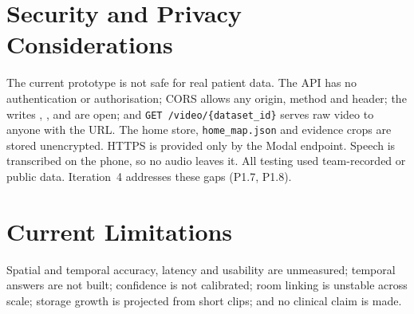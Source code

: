 \section{Security and Privacy Considerations}
\label{sec:security}
The current prototype is not safe for real patient data. The API has no
authentication or authorisation; CORS allows any origin, method and header; the
writes , ,  and
 are open; and \texttt{GET /video/\{dataset\_id\}} serves
raw video to anyone with the URL. The home store, \texttt{home\_map.json} and
evidence crops are stored unencrypted. HTTPS is provided only by the Modal
endpoint. Speech is transcribed on the phone, so no audio leaves it. All testing
used team-recorded or public data. Iteration~4 addresses these gaps (P1.7, P1.8).

\section{Current Limitations}
Spatial and temporal accuracy, latency and usability are unmeasured; temporal
answers are not built; confidence is not calibrated; room linking is unstable
across scale; storage growth is projected from short clips; and no clinical
claim is made.

